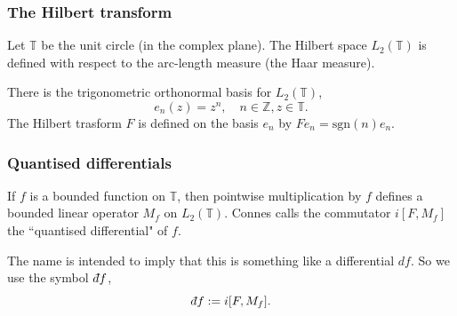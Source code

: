 \documentclass{beamer} %
\theoremstyle{definition} %
\newcommand{\Itgr}{\mathbb{Z}}
\newcommand{\Circ}{\mathbb{T}}
\newcommand{\sgn}{\mathrm{sgn}}
\def\qd{\,{\mathchar'26\mkern-12mu d}}
\begin{document}

\begin{frame}\frametitle{The Hilbert transform}
    Let $\Circ$ be the unit circle (in the complex plane). The Hilbert space $L_2(\Circ)$ is
    defined with respect to the arc-length measure (the Haar measure).
    
    There is the trigonometric orthonormal basis for $L_2(\Circ)$,
    \begin{equation*}
        e_n(z) = z^n,\quad n\in \Itgr, z \in \Circ.
    \end{equation*}
    The Hilbert trasform $F$ is defined on the basis $e_n$ by $Fe_n = \sgn(n)e_n$.
\end{frame}

\begin{frame}\frametitle{Quantised differentials}
    If $f$ is a bounded function on $\Circ$, then pointwise multiplication
    by $f$ defines a bounded linear operator $M_f$ on $L_2(\Circ)$. 
    Connes calls the commutator $i[F,M_f]$ the ``quantised differential" of $f$.
    
    The name is intended to imply that this is something like a differential $df$. So we use the symbol $\qd f$,
    \begin{equation*}
        \qd f := i[F,M_f].
    \end{equation*}
\end{frame}
\end{document}
